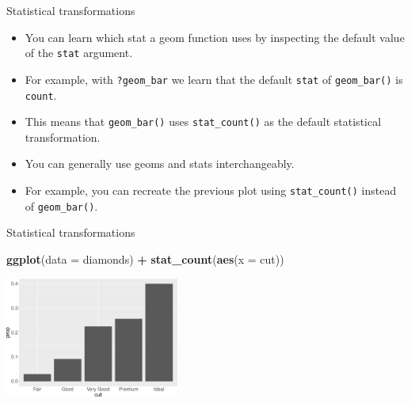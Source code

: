 \documentclass[ignorenonframetext,]{beamer}
\newenvironment{Shaded}{\begin{snugshade}}{\end{snugshade}}
\newcommand{\DataTypeTok}[1]{\textcolor[rgb]{0.13,0.29,0.53}{#1}}
\newcommand{\KeywordTok}[1]{\textcolor[rgb]{0.13,0.29,0.53}{\textbf{#1}}}
\newcommand{\NormalTok}[1]{#1}
\newcommand{\OperatorTok}[1]{\textcolor[rgb]{0.81,0.36,0.00}{\textbf{#1}}}
\newcommand{\StringTok}[1]{\textcolor[rgb]{0.31,0.60,0.02}{#1}}
\begin{document}
\begin{frame}[fragile]{Statistical transformations}
\protect\hypertarget{statistical-transformations-4}{}

\begin{itemize}
\item
  You can learn which stat a geom function uses by inspecting the
  default value of the \texttt{stat} argument.
\item
  For example, with \texttt{?geom\_bar} we learn that the default
  \texttt{stat} of \texttt{geom\_bar()} is \texttt{count}.
\item
  This means that \texttt{geom\_bar()} uses \texttt{stat\_count()} as
  the default statistical transformation.
\item
  You can generally use geoms and stats interchangeably.
\item
  For example, you can recreate the previous plot using
  \texttt{stat\_count()} instead of \texttt{geom\_bar()}.
\end{itemize}

\end{frame}

\begin{frame}[fragile]{Statistical transformations}
\protect\hypertarget{statistical-transformations-5}{}

\begin{Shaded}
\begin{Highlighting}[]
\KeywordTok{ggplot}\NormalTok{(}\DataTypeTok{data =}\NormalTok{ diamonds) }\OperatorTok{+}\StringTok{ }
\StringTok{  }\KeywordTok{stat_count}\NormalTok{(}\KeywordTok{aes}\NormalTok{(}\DataTypeTok{x =}\NormalTok{ cut))}
\end{Highlighting}
\end{Shaded}

\begin{center}\includegraphics[height=150px]{data-visualization_files/figure-beamer/unnamed-chunk-122-1} \end{center}

\end{frame}
\end{document}
